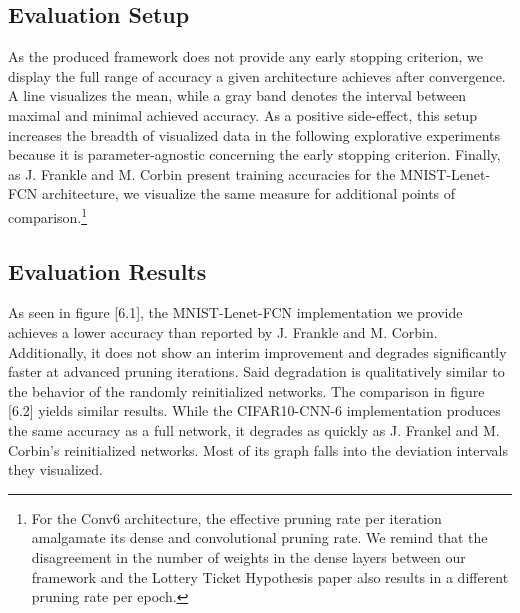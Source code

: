 \subsection*{Evaluation Setup}
As the produced framework does not provide any early stopping criterion, we display the full range of accuracy a given architecture achieves after convergence. A line visualizes the mean, while a gray band denotes the interval between maximal and minimal achieved accuracy. As a positive side-effect, this setup increases the breadth of visualized data in the following explorative experiments because it is parameter-agnostic concerning the early stopping criterion. Finally,  as J. Frankle and M. Corbin present training accuracies for the MNIST-Lenet-FCN architecture, we visualize the same measure for additional points of comparison.\footnote{
	For the Conv6 architecture, the effective pruning rate per iteration amalgamate its dense and convolutional pruning rate. We remind that the disagreement in the number of weights in the dense layers between our framework and the Lottery Ticket Hypothesis paper also results in a different pruning rate per epoch. 
} 
\subsection*{Evaluation Results}
As seen in figure [6.1], the MNIST-Lenet-FCN implementation we provide achieves a lower accuracy than reported by J. Frankle and M. Corbin. Additionally, it does not show an interim improvement and degrades significantly faster at advanced pruning iterations. Said degradation is qualitatively similar to the behavior of the randomly reinitialized networks.
The comparison in figure [6.2] yields similar results. While the CIFAR10-CNN-6 implementation produces the same accuracy as a full network, it degrades as quickly as J. Frankel and M. Corbin's reinitialized networks. Most of its graph falls into the deviation intervals they visualized.

